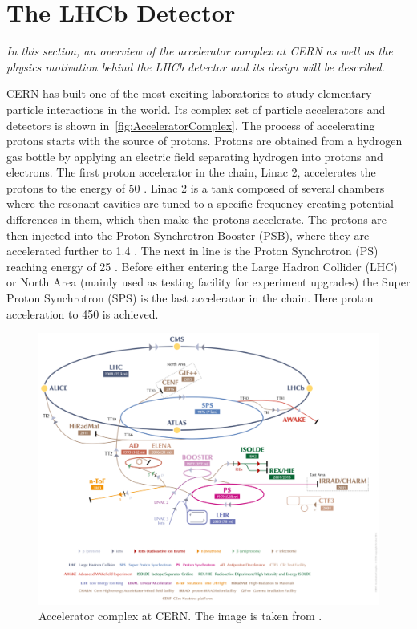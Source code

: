 \chapter{The LHCb Detector}
\label{chap:dec}

\textit{In this section, an overview of the accelerator complex at CERN as well as the physics motivation behind the \Gls{LHCb} detector and its design will be described.}

CERN has built one of the most exciting laboratories to study elementary particle interactions in the world. Its complex set of particle accelerators and detectors is shown in~\autoref{fig:AcceleratorComplex}. The process of accelerating protons starts with the source of protons. Protons are obtained from a hydrogen gas bottle by applying an electric field separating hydrogen into protons and electrons. The first proton accelerator in the chain, Linac 2, accelerates the protons to the energy of 50 \mev. Linac 2 is a tank composed of several chambers where the resonant cavities are tuned to a specific frequency creating potential differences in them, which then make the protons accelerate. The protons are then injected into the Proton Synchrotron Booster (\Gls{PSB}), where they are accelerated further to 1.4 \gev. The next in line is the Proton Synchrotron (\Gls{PS}) reaching energy of 25 \gev. Before either entering the Large Hadron Collider (\Gls{LHC}) or North Area (mainly used as testing facility for experiment upgrades) the Super Proton Synchrotron (\Gls{SPS}) is the last accelerator in the chain. Here proton acceleration to 450 \gev is achieved.

\begin{figure}
  \centering
  \includegraphics[width=1.0\linewidth]{figs/detector/AccComplexpng2pdf_cropped.pdf}
	\caption{Accelerator complex at CERN. The image is taken from \cite{complex}.}
  \label{fig:AcceleratorComplex}
\end{figure}

